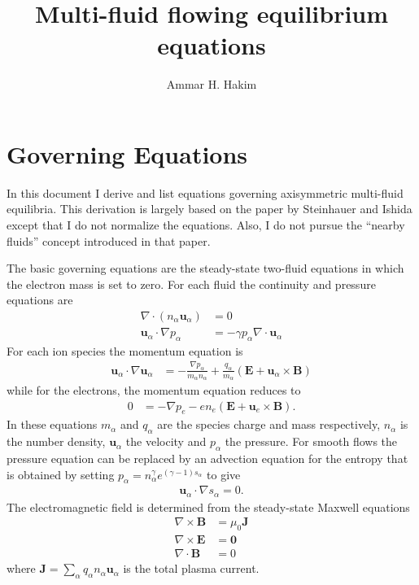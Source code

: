 \documentclass[11pt, reqno]{amsart}
\title[Multifluid Equilibrium]{Multi-fluid flowing equilibrium equations}%
\author{Ammar H. Hakim}%
\date{}
\newcommand{\mvec}[1]{\mathbf{#1}}
\theoremstyle{definition}
\begin{document}
\maketitle

\section{Governing Equations}

In this document I derive and list equations governing axisymmetric
multi-fluid equilibria. This derivation is largely based on the paper
by Steinhauer and Ishida\cite{Steinhauer:2006p526} except that I do
not normalize the equations. Also, I do not pursue the ``nearby
fluids'' concept introduced in that paper. 


The basic governing equations are the steady-state two-fluid equations
in which the electron mass is set to zero. For each fluid the
continuity and pressure equations are
\begin{align}
  \nabla\cdot(n_\alpha\mvec{u}_\alpha) &= 0 \label{eq:divNU} \\
  \mvec{u}_\alpha\cdot\nabla p_\alpha &= -\gamma p_\alpha \nabla\cdot\mvec{u}_\alpha
\end{align}
For each ion species the momentum equation is
\begin{align}
  \mvec{u}_\alpha\cdot\nabla \mvec{u}_\alpha &= -\frac{\nabla
    p_\alpha}{m_\alpha n_\alpha} 
  + \frac{q_\alpha}{m_\alpha}(\mvec{E} + \mvec{u}_\alpha\times
  \mvec{B})
\end{align}
while for the electrons, the momentum equation reduces to
\begin{align}
  0 &= -\nabla p_e - en_e(\mvec{E} + \mvec{u}_e\times\mvec{B}).
\end{align}
In these equations $m_\alpha$ and $q_\alpha$ are the species charge
and mass respectively, $n_\alpha$ is the number density,
$\mvec{u}_\alpha$ the velocity and $p_\alpha$ the pressure. For smooth
flows the pressure equation can be replaced by an advection equation
for the entropy that is obtained by setting $p_\alpha =
n_\alpha^\gamma e^{(\gamma-1)s_\alpha}$ to give
\begin{align}
  \mvec{u}_\alpha\cdot\nabla s_\alpha = 0.
\end{align}
The electromagnetic field is determined from the steady-state Maxwell
equations
\begin{align}
  \nabla\times \mvec{B} &= \mu_0 \mvec{J} \label{eq:curlB} \\
  \nabla\times \mvec{E} &= \mvec{0} \\
  \nabla\cdot\mvec{B} &= 0 \label{eq:divB}
\end{align}
where $\mvec{J}=\sum_\alpha q_\alpha n_\alpha\mvec{u}_\alpha$ is the
total plasma current.
\end{document}
